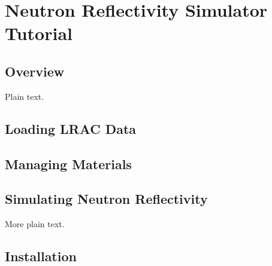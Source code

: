 \section{Neutron Reflectivity Simulator Tutorial}

\subsection{Overview}

Plain text.

\subsection{Loading LRAC Data}
\subsection{Managing Materials}
\subsection{Simulating Neutron Reflectivity}

More plain text.

\subsection{Installation}
